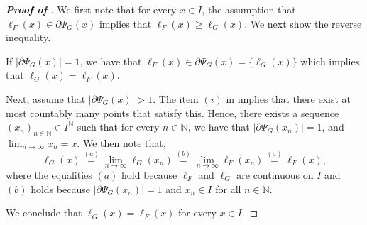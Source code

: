 \begin{proof}[\textbf{Proof of }]
We first note that for every $x \in I$, the assumption that $\ell_{F}(x) \in \partial \Psi_{G}(x)$ implies that $\ell_{F}(x) \geq \ell_{G}(x)$. We next show the reverse inequality.

If $|\partial \Psi_{G}(x)| = 1$, we have that $\ell_{F}(x) \in \partial \Psi_{G}(x) =  \{ \ell_{G}(x) \} $ which implies that $\ell_{G}(x) = \ell_{F}(x)$.

Next, assume that $|\partial \Psi_{G}(x)| > 1$.
The item $(i)$ in  implies that there exist at most countably many points that satisfy this. Hence, there exists a sequence $(x_n)_{n \in \mathbb{N}} \in I^{\mathbb{N}}$ such that for every $n \in \mathbb{N}$, we have that $|\partial \Psi_{G}(x_n)| = 1$, and $\lim_{n \to \infty} x_n = x$.
We then note that,
\begin{equation*}
\ell_{G}(x) \stackrel{(a)}{=} \lim_{n \to \infty} \ell_{G}(x_n) \stackrel{(b)}{=} \lim_{n \to \infty} \ell_{F}(x_n) \stackrel{(a)}{=} \ell_{F}(x), 
\end{equation*}
where the equalities $(a)$ hold because $\ell_{F}$ and $\ell_{G}$ are continuous on $I$ and $(b)$ holds because $|\partial \Psi_{G}(x_n)| = 1$ and $x_n \in I$ for all $n \in \mathbb{N}$. 

We conclude that $\ell_{G}(x) = \ell_{F}(x)$ for every $x \in I$.
\end{proof}


